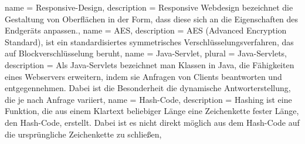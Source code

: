 {
  name = Responsive-Design,
  description = {Responsive Webdesign bezeichnet die Gestaltung von Oberflächen in der Form, dass diese sich an die Eigenschaften des Endgeräts anpassen.},
}
{
  name = AES,
  description = {AES (Advanced Encryption Standard), ist ein standardisiertes symmetrisches Verschlüsselungsverfahren, das auf Blockverschlüsselung beruht},
}
{
  name = Java-Servlet,
  plural = Java-Servlets,
  description = {Als Java-Servlets bezeichnet man Klassen in Java, die Fähigkeiten eines Webservers erweitern, indem sie Anfragen von Clients beantworten und entgegennehmen. Dabei ist die Besonderheit die dynamische Antworterstellung, die je nach Anfrage variiert},
}
{
  name = Hash-Code,
  description = {Hashing ist eine Funktion, die aus einem Klartext beliebiger Länge eine Zeichenkette fester Länge, den Hash-Code, erstellt. Dabei ist es nicht direkt möglich aus dem Hash-Code auf die ursprüngliche Zeichenkette zu schließen},
}

